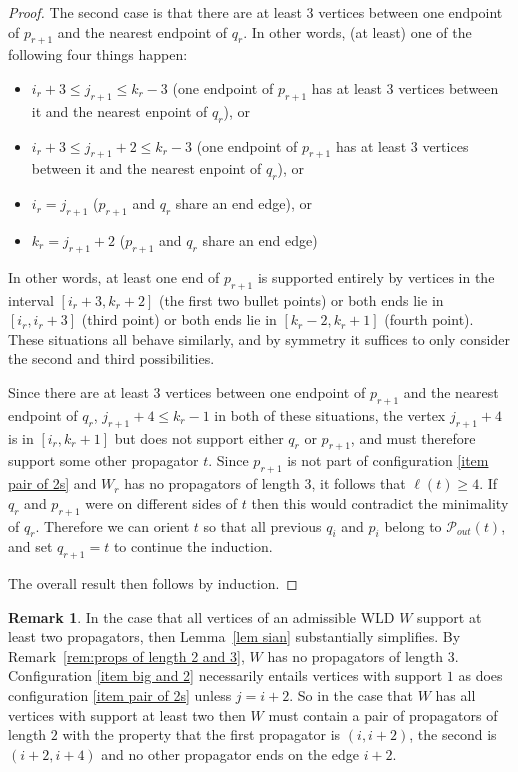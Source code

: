 \documentclass[11pt]{article}
\newcommand{\cP}{\mathcal{P}}
\theoremstyle{remark}
\theoremstyle{definition}
\newtheorem{rmk}[thm]{Remark}
\begin{document}
\begin{proof}
The second case is that there are at least $3$ vertices between one endpoint of $p_{r+1}$ and the nearest endpoint of $q_r$. In other words, (at least) one of the following four things happen:
\begin{itemize} 
\item $i_r+3 \leq j_{r+1}\leq k_r-3$ (one endpoint of $p_{r+1}$ has at least 3 vertices between it and the nearest enpoint of $q_r$), or
\item $i_r+3 \leq j_{r+1}+2\leq k_r-3$ (one endpoint of $p_{r+1}$ has at least 3 vertices between it and the nearest enpoint of $q_r$), or
\item $i_r = j_{r+1}$ ($p_{r+1}$ and $q_r$ share an end edge), or 
\item $k_r = j_{r+1} +2$  ($p_{r+1}$ and $q_r$ share an end edge)
\end{itemize}
In other words, at least one end of $p_{r+1}$ is supported entirely by vertices in the interval $[i_r+3,k_r+2]$ (the first two bullet points) or both ends lie in $[i_r, i_r+3]$ (third point) or both ends lie in $[k_r-2, k_r+1]$ (fourth point). These situations all behave similarly, and by symmetry it suffices to only consider the second and third possibilities. 

Since there are at least $3$ vertices between one endpoint of $p_{r+1}$ and the nearest endpoint of $q_r$,  $j_{r+1}+4 \leq k_r-1$ in both of these situations, the vertex $j_{r+1}+4$ is in $[i_r, k_r+1]$ but does not support either $q_r$ or $p_{r+1}$, and must therefore support some other propagator $t$.  Since $p_{r+1}$ is not part of configuration \ref{item pair of 2s} and $W_r$ has no propagators of length 3, it follows that $\ell(t) \geq 4$.  If $q_r$ and $p_{r+1}$ were on different sides of $t$ then this would contradict the minimality of $q_r$.  Therefore we can orient $t$ so that all previous $q_i$ and $p_i$ belong to $\cP_{out}(t)$, and set $q_{r+1} = t$ to continue the induction.

The overall result then follows by induction.

\end{proof}


\begin{rmk}
In the case that all vertices of an admissible WLD $W$ support at least two propagators, then Lemma~\ref{lem sian} substantially simplifies.  By Remark~\ref{rem:props of length 2 and 3}, $W$ has no propagators of length $3$.  Configuration \ref{item big and 2} necessarily entails vertices with support $1$ as does configuration \ref{item pair of 2s} unless $j=i+2$.  So in the case that $W$ has all vertices with support at least two then $W$ must contain a pair of propagators of length $2$  with the property that the first propagator is $(i, i+2)$, the second is $(i+2, i+4)$ and no other propagator ends on the edge $i+2$.
\end{rmk}
\end{document}
